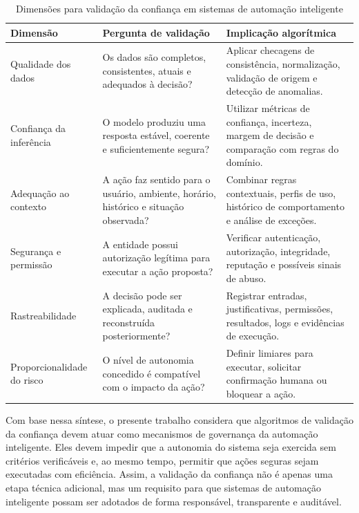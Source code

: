 \documentclass[12pt]{article}
\begin{document}
\begin{table}[ht]
\centering
\caption{Dimensões para validação da confiança em sistemas de automação inteligente}
\label{tab:dimensoes-confianca}
\begin{tabular}{|p{3.2cm}|p{5.0cm}|p{5.0cm}|}
\hline
\textbf{Dimensão} & \textbf{Pergunta de validação} & \textbf{Implicação algorítmica} \\
\hline
Qualidade dos dados & Os dados são completos, consistentes, atuais e adequados à decisão? & Aplicar checagens de consistência, normalização, validação de origem e detecção de anomalias. \\
\hline
Confiança da inferência & O modelo produziu uma resposta estável, coerente e suficientemente segura? & Utilizar métricas de confiança, incerteza, margem de decisão e comparação com regras do domínio. \\
\hline
Adequação ao contexto & A ação faz sentido para o usuário, ambiente, horário, histórico e situação observada? & Combinar regras contextuais, perfis de uso, histórico de comportamento e análise de exceções. \\
\hline
Segurança e permissão & A entidade possui autorização legítima para executar a ação proposta? & Verificar autenticação, autorização, integridade, reputação e possíveis sinais de abuso. \\
\hline
Rastreabilidade & A decisão pode ser explicada, auditada e reconstruída posteriormente? & Registrar entradas, justificativas, permissões, resultados, logs e evidências de execução. \\
\hline
Proporcionalidade do risco & O nível de autonomia concedido é compatível com o impacto da ação? & Definir limiares para executar, solicitar confirmação humana ou bloquear a ação. \\
\hline
\end{tabular}
\end{table}

Com base nessa síntese, o presente trabalho considera que algoritmos de validação da confiança devem atuar como mecanismos de governança da automação inteligente. Eles devem impedir que a autonomia do sistema seja exercida sem critérios verificáveis e, ao mesmo tempo, permitir que ações seguras sejam executadas com eficiência. Assim, a validação da confiança não é apenas uma etapa técnica adicional, mas um requisito para que sistemas de automação inteligente possam ser adotados de forma responsável, transparente e auditável.
\end{document}
